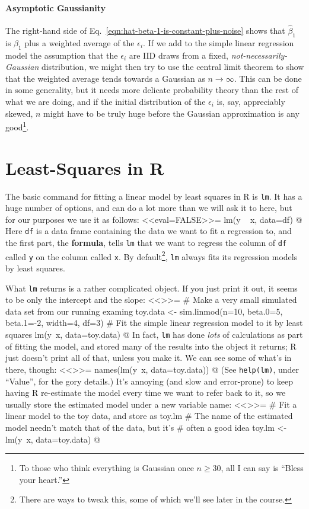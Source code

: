 \documentclass{article}
\begin{document}
\paragraph{Asymptotic Gaussianity} The right-hand side of Eq.\
\ref{eqn:hat-beta-1-is-constant-plus-noise} shows that $\hat{\beta}_1$ is
$\beta_1$ plus a weighted average of the $\epsilon_i$.  If we add to the simple
linear regression model the assumption that the $\epsilon_i$ are IID draws from
a fixed, {\em not-necessarily-Gaussian} distribution, we might then try to use
the central limit theorem to show that the weighted average tends towards a
Gaussian as $n\rightarrow\infty$.  This can be done in some generality, but it
needs more delicate probability theory than the rest of what we are doing, and
if the initial distribution of the $\epsilon_i$ is, say, appreciably skewed,
$n$ might have to be truly huge before the Gaussian approximation is any
good\footnote{To those who think everything is Gaussian once $n \geq 30$, all I
  can say is ``Bless your heart.''}.




\section{Least-Squares in R}

The basic command for fitting a linear model by least squares in R is
\texttt{lm}.  It has a huge number of options, and can do a lot more than
we will ask it to here, but for our purposes we use it as follows:
<<eval=FALSE>>=
lm(y ~ x, data=df)
@
Here \texttt{df} is a data frame containing the data we want to fit a
regression to, and the first part, the {\bf formula}, tells \texttt{lm} that we
want to regress the column of \texttt{df} called \texttt{y} on the column
called \texttt{x}.  By default\footnote{There are ways to tweak this, some of
  which we'll see later in the course.}, \texttt{lm} always fits its
regression models by least squares.

What \texttt{lm} returns is a rather complicated object.  If you just
print it out, it seems to be only the intercept and the slope:
<<>>=
# Make a very small simulated data set from our running examing
toy.data <- sim.linmod(n=10, beta.0=5, beta.1=-2, width=4, df=3)
# Fit the simple linear regression model to it by least squares
lm(y~x, data=toy.data)
@
In fact, \texttt{lm} has done {\em lots} of calculations as part of fitting
the model, and stored many of the results into the object it returns; R just
doesn't print all of that, unless you make it.  We can see some of what's
in there, though:
<<>>=
names(lm(y~x, data=toy.data))
@
(See \texttt{help(lm)}, under ``Value'', for the gory details.)  It's
annoying (and slow and error-prone) to keep having R re-estimate the model
every time we want to refer back to it, so we usually store the estimated
model under a new variable name:
<<>>=
# Fit a linear model to the toy data, and store as toy.lm
  # The name of the estimated model needn't match that of the data, but it's
  # often a good idea
toy.lm <- lm(y~x, data=toy.data)
@
\end{document}
